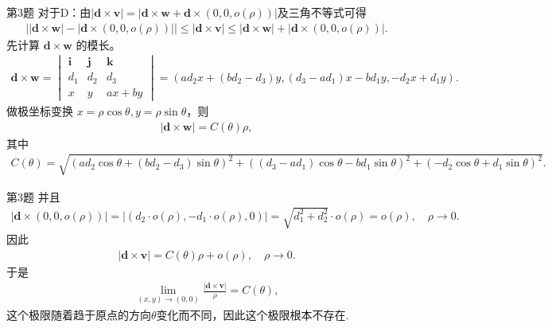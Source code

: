 \documentclass[aspectratio=169]{beamer}
\begin{document}
\begin{frame}{第3题}
对于D：由$\left| \boldsymbol{d}\times \boldsymbol{v} \right|=\left| \boldsymbol{d}\times \boldsymbol{w}+\boldsymbol{d}\times \left( 0,0,o\left( \rho \right) \right) \right|
$及三角不等式可得
\begin{align*}
\left| \left| \boldsymbol{d}\times \boldsymbol{w} \right|-\left| \boldsymbol{d}\times \left( 0,0,o\left( \rho \right) \right) \right| \right|\leqslant \left| \boldsymbol{d}\times \boldsymbol{v} \right|\leqslant \left| \boldsymbol{d}\times \boldsymbol{w} \right|+\left| \boldsymbol{d}\times \left( 0,0,o\left( \rho \right) \right) \right|.
\end{align*}
先计算 $\boldsymbol{d}\times \boldsymbol{w}$ 的模长。
\begin{align*}
\boldsymbol{d}\times \boldsymbol{w}=
\begin{vmatrix}
\boldsymbol{i} & \boldsymbol{j} & \boldsymbol{k}\\
d_1 & d_2 & d_3\\
x & y & ax+by
\end{vmatrix}=\left( a d_2 x + \left( b d_2 - d_3 \right) y, \left( d_3 - a d_1 \right) x - b d_1 y, -d_2 x + d_1 y \right).
\end{align*}
做极坐标变换 $x=\rho \cos \theta, y=\rho \sin \theta$，则
{\footnotesize \begin{align*}
\left| \boldsymbol{d}\times \boldsymbol{w} \right| = C(\theta)\rho,
\end{align*}}
其中
{\footnotesize 
\begin{align*}
C(\theta)=\sqrt{\left( a d_2 \cos \theta + \left( b d_2 - d_3 \right) \sin \theta \right) ^2 + \left( \left( d_3 - a d_1 \right) \cos \theta - b d_1 \sin \theta \right) ^2 + \left( -d_2 \cos \theta + d_1 \sin \theta \right) ^2}.
\end{align*}}
\end{frame}

\begin{frame}{第3题}
并且
\begin{align*}
\left| \boldsymbol{d}\times \left( 0,0,o\left( \rho \right) \right) \right| =\left| \left( d_2\cdot o\left( \rho \right) ,-d_1\cdot o\left( \rho \right) ,0 \right)\right|= \sqrt{d_1^2+d_2^2}\cdot o\left( \rho \right) = o\left( \rho \right) ,\quad \rho \rightarrow 0.
\end{align*}
因此
\begin{align*}
\left| \boldsymbol{d}\times \boldsymbol{v} \right| = C(\theta)\rho + o\left( \rho \right) ,\quad \rho \rightarrow 0.
\end{align*}
于是
\begin{align*}
\underset{\left( x,y \right) \rightarrow \left( 0,0 \right)}{\lim}\frac{\left| \boldsymbol{d}\times \boldsymbol{v} \right|}{\rho}=C(\theta),
\end{align*}
这个极限随着趋于原点的方向$\theta$变化而不同，因此这个极限根本不存在.
\end{frame}
\end{document}
